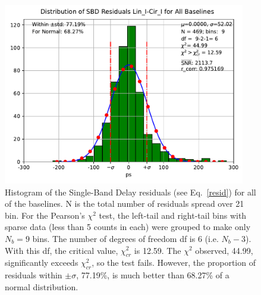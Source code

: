 \documentclass[letterpaper,twoside,12pt]{article}
\begin{document}
\begin{figure}[ht!]
  \begin{center}
  \includegraphics[width=25pc]{Distr_SBD_Lin_I-Cir_I_Diff.pdf}
  \caption{\small Histogram of the Single-Band Delay residuals (see Eq.~\eqref{resid}) for all of the baselines. N is the total number of residuals spread over 21 bin. For the Pearson's $\chi^2$ test, the left-tail and right-tail bins with sparse data (less than 5 counts in each) were grouped to make only $N_b=9$ bins. The number of degrees of freedom df is 6 (i.e. $N_b-3$). With this df, the critical value, $\chi^2_{cr}$ is 12.59. The $\chi^2$ observed, 44.99, significantly exceeds $\chi^2_{cr}$, so the test fails. However, the proportion of residuals within $\pm\sigma$, 77.19\%, is much better than 68.27\% of a normal distribution.}
  \label{dsbd_distr}
  \end{center}
\end{figure}
\end{document}
